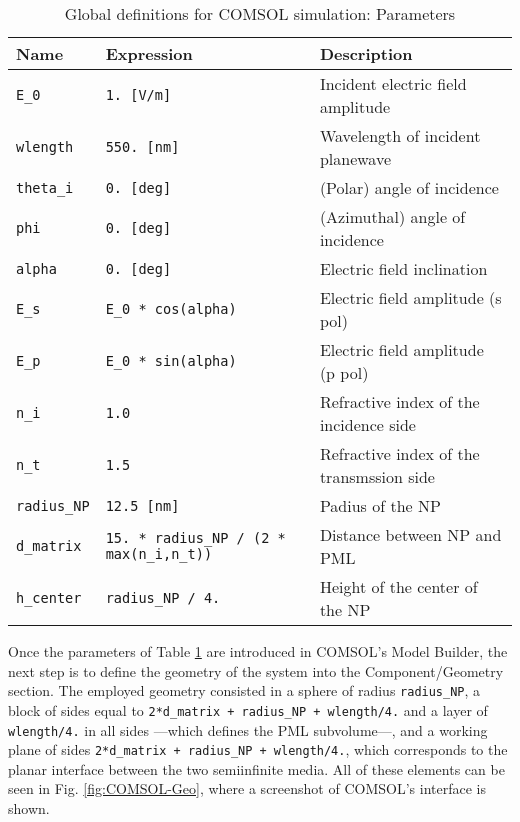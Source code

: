 \begin{table}[t!]
 \caption{Global definitions for COMSOL simulation: Parameters }
 \label{tab:Global-parameters}
 \centering
 \small
    \begin{tabular}{ |l|l|l| }
     \hline
     \textbf{Name}          &   \textbf{Expression}                              &   \textbf{Description} \\ \hline \hline
     \lstinline!E_0!        &   \lstinline!1. [V/m]!                             &   Incident electric field amplitude \\
     \lstinline!wlength!    &   \lstinline!550. [nm]!                            &   Wavelength of incident planewave \\
     \lstinline!theta_i!    &   \lstinline!0. [deg]!                             &   (Polar) angle of incidence \\
     \lstinline!phi!        &   \lstinline!0. [deg]!                             &   (Azimuthal) angle of incidence \\
     \lstinline!alpha!      &   \lstinline!0. [deg]!                             &   Electric field inclination \\
     \lstinline!E_s!        &   \lstinline!E_0 * cos(alpha)!                     &   Electric field amplitude (s pol) \\
     \lstinline!E_p!        &   \lstinline!E_0 * sin(alpha)!                     &   Electric field amplitude (p pol) \\
     \lstinline!n_i!        &   \lstinline!1.0!                                  &   Refractive index of the incidence side \\
     \lstinline!n_t!        &   \lstinline!1.5!                                  &   Refractive index of the transmssion side \\
     \lstinline!radius_NP!  &   \lstinline!12.5 [nm]!                            &   Padius of the NP  \\
     \lstinline!d_matrix!   &   \lstinline!15. * radius_NP / (2 * max(n_i,n_t))! &   Distance between NP and PML \\
     \lstinline!h_center!   &   \lstinline!radius_NP / 4.!                       &   Height of the center of the NP\\
     \hline \hline
    \end{tabular}
\end{table}

Once the parameters of Table \ref{tab:Global-parameters} are introduced in COMSOL's Model Builder, the next step is to define the geometry of the system into the Component/Geometry section. The employed geometry consisted in a sphere of radius \lstinline!radius_NP!, a block of sides equal to \lstinline!2*d_matrix + radius_NP + wlength/4.! and a layer of \lstinline!wlength/4.! in all sides ---which defines the PML subvolume---, and a working plane of sides \lstinline!2*d_matrix + radius_NP + wlength/4.!, which corresponds to the planar interface between the two semiinfinite media. All of these elements can be seen in Fig. \ref{fig:COMSOL-Geo}, where a screenshot of COMSOL's interface is shown.

